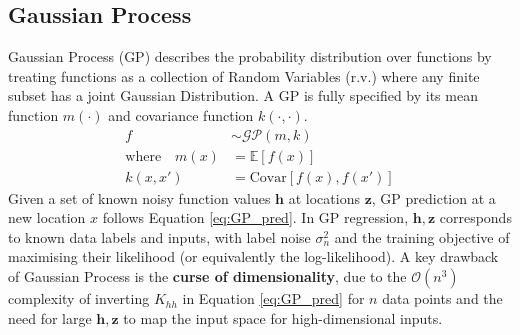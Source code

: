 \documentclass{article}
\begin{document}
\subsection{Gaussian Process}
Gaussian Process (GP) \cite{GaussianProcess} describes the probability distribution over functions by treating functions as a collection of Random Variables (r.v.) where any finite subset has a joint Gaussian Distribution. A GP is fully specified by its mean function $m(\cdot)$ and covariance function $k(\cdot, \cdot)$.
\begin{equation}
    \begin{aligned}
        f                                    & \sim\mathcal{GP}(m,k)
        \\
        \text{where} \quad m(x) & =\mathbb{E} [f(x)]
        \\
        k(x,x')    & =\text{Covar}[f(x), f(x')]
    \end{aligned}
    \label{eq:GP_def}
\end{equation}
Given a set of known noisy function values $\boldsymbol{h}$ at locations $\boldsymbol{z}$, GP prediction at a new location $x$ follows Equation \ref{eq:GP_pred}. In GP regression, $\boldsymbol{h}, \boldsymbol{z}$ corresponds to known data labels and inputs, with label noise $\sigma_n^2$ and the training objective of maximising their likelihood (or equivalently the log-likelihood). A key drawback of Gaussian Process is the \textbf{curse of dimensionality}, due to the $\mathcal{O}(n^3)$ complexity of inverting $K_{hh}$ in Equation \ref{eq:GP_pred} for $n$ data points and the need for large $\boldsymbol{h}, \boldsymbol{z}$ to map the input space for high-dimensional inputs.
\end{document}
